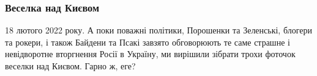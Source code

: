  
 
 
 
 
\clearpage
\subsubsection{Веселка над Києвом}

18 лютого 2022 року. А поки поважні політики, Порошенки та Зеленські, блогери
та рокери, і також Байдени та Псакі завзято обговорюють те саме
страшне і невідворотне вторгнення Росії в Україну, ми вирішили зібрати трохи
фоточок веселки над Києвом. Гарно ж, еге?

